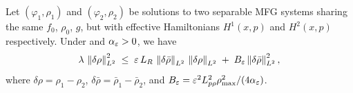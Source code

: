 \begin{lemma}\label{lem:stability}
Let $(\varphi_1,\rho_1)$ and $(\varphi_2,\rho_2)$ be solutions to two
separable MFG systems sharing the same $f_0$, $\rho_0$, $g$, but with
effective Hamiltonians $H^1(x,p)$ and $H^2(x,p)$ respectively.
Under  and
\(\alpha_\varepsilon>0\), we have
\begin{equation}\label{eq:stability}
  \lambda\, \left\lVert \delta\rho \right\rVert^2_{L^2}
  \;\leq\;
  \varepsilon\, L_R\, \left\lVert \delta\bar\rho \right\rVert_{L^2}\, \left\lVert \delta\rho \right\rVert_{L^2}
  \;+\; B_\varepsilon\left\lVert \delta\bar\rho \right\rVert_{L^2}^2,
\end{equation}
where $\delta\rho = \rho_1 - \rho_2$, $\delta\bar\rho = \bar\rho_1 - \bar\rho_2$,
and \(B_\varepsilon=\varepsilon^2L_{p\rho}^2\rho_{\max}^2/(4\alpha_\varepsilon)\).
\end{lemma}

